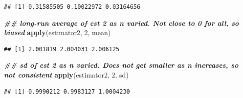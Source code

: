 \documentclass[
]{book}
\newenvironment{Shaded}{\begin{snugshade}}{\end{snugshade}}
\newcommand{\DecValTok}[1]{\textcolor[rgb]{0.00,0.00,0.81}{#1}}
\newcommand{\DocumentationTok}[1]{\textcolor[rgb]{0.56,0.35,0.01}{\textbf{\textit{#1}}}}
\newcommand{\FunctionTok}[1]{\textcolor[rgb]{0.13,0.29,0.53}{\textbf{#1}}}
\newcommand{\NormalTok}[1]{#1}
\theoremstyle{definition}
\theoremstyle{definition}
\theoremstyle{definition}
\theoremstyle{definition}
\theoremstyle{remark}
\begin{document}
\begin{verbatim}
## [1] 0.31585505 0.10022972 0.03164656
\end{verbatim}

\begin{Shaded}
\begin{Highlighting}[]
\DocumentationTok{\#\# long{-}run average of est 2 as n varied. Not close to 0 for all, so biased}
\FunctionTok{apply}\NormalTok{(estimator2, }\DecValTok{2}\NormalTok{, mean)}
\end{Highlighting}
\end{Shaded}

\begin{verbatim}
## [1] 2.001819 2.004031 2.006125
\end{verbatim}

\begin{Shaded}
\begin{Highlighting}[]
\DocumentationTok{\#\# sd of est 2 as n varied. Does not get smaller as n increases, so not consistent}
\FunctionTok{apply}\NormalTok{(estimator2, }\DecValTok{2}\NormalTok{, sd)}
\end{Highlighting}
\end{Shaded}

\begin{verbatim}
## [1] 0.9990212 0.9983127 1.0004230
\end{verbatim}
\end{document}
